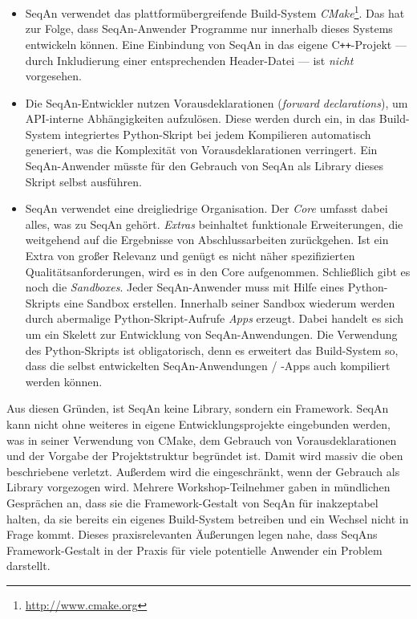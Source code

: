 \begin{description}
  \begin{itemize}
    \item SeqAn verwendet das plattformübergreifende Build-System \textit{CMake}\footnote{\url{http://www.cmake.org}}. Das hat zur Folge, dass SeqAn-Anwender Programme nur innerhalb dieses Systems entwickeln können. Eine Einbindung von SeqAn in das eigene C{}\verb!++!-Projekt --- durch Inkludierung einer entsprechenden Header-Datei --- ist \textit{nicht} vorgesehen.
    \item Die SeqAn-Entwickler nutzen Vorausdeklarationen (\textit{forward declarations}), um API-interne Abhängigkeiten aufzulösen. Diese werden durch ein, in das Build-System integriertes Python-Skript bei jedem Kompilieren automatisch generiert, was die Komplexität von Vorausdeklarationen verringert. Ein SeqAn-Anwender müsste für den Gebrauch von SeqAn als Library dieses Skript selbst ausführen.
    \item SeqAn verwendet eine dreigliedrige Organisation. Der \textit{Core} umfasst dabei alles, was zu SeqAn gehört. \textit{Extras} beinhaltet funktionale Erweiterungen, die weitgehend auf die Ergebnisse von Abschlussarbeiten zurückgehen. Ist ein Extra von großer Relevanz und genügt es nicht näher spezifizierten Qualitätsanforderungen, wird es in den Core aufgenommen. Schließlich gibt es noch die \textit{Sandboxes}. Jeder SeqAn-Anwender muss mit Hilfe eines Python-Skripts eine Sandbox erstellen. Innerhalb seiner Sandbox wiederum werden durch abermalige Python-Skript-Aufrufe \textit{Apps} erzeugt. Dabei handelt es sich um ein Skelett zur Entwicklung von SeqAn-Anwendungen. Die Verwendung des Python-Skripts ist obligatorisch, denn es erweitert das Build-System so, dass die selbst entwickelten SeqAn-Anwendungen / -Apps auch kompiliert werden können.
  \end{itemize}
  
  Aus diesen Gründen, ist SeqAn keine Library, sondern ein Framework. SeqAn kann nicht ohne weiteres in eigene Entwicklungsprojekte eingebunden werden, was in seiner Verwendung von CMake, dem Gebrauch von Vorausdeklarationen und der Vorgabe der Projektstruktur begründet ist. Damit wird massiv die oben beschriebene  verletzt. Außerdem wird die  eingeschränkt, wenn der Gebrauch als Library vorgezogen wird. Mehrere Workshop-Teilnehmer gaben in mündlichen Gesprächen an, dass sie die Framework-Gestalt von SeqAn für inakzeptabel halten, da sie bereits ein eigenes Build-System betreiben und ein Wechsel nicht in Frage kommt. Dieses praxisrelevanten Äußerungen legen nahe, dass SeqAns Framework-Gestalt in der Praxis für viele potentielle Anwender ein Problem darstellt.
  

\end{description}
